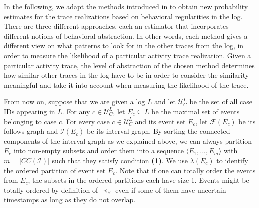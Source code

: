 In the following, we adapt the methods introduced in \cite{por} to obtain new probability estimates for the trace realizations based on behavioral regularities in the log.
There are three different approaches, each an estimator that incorporates different notions of behavioral abstraction.
In other words, each method gives a different view on what patterns to look for in the other traces from the log, in order to measure the likelihood of a particular activity trace realization.
Given a particular activity trace, the level of abstraction of the chosen method determines how similar other traces in the log have to be in order to consider the similarity meaningful and take it into account when measuring the likelihood of the trace.

From now on, suppose that we are given a log $L$ and let $\mathcal{U}_C^L$ be the set of all case IDs appearing in $L$.
For any $c \in \mathcal{U}_C^L$, let $E_c \subseteq L$ be the maximal set of events belonging to case $c$.
For every case $c \in \mathcal{U}_C^L$ and its event set $E_c$, let $\mathcal{F}(E_c)$ be its follows graph and $\mathcal{I}(E_c)$ be its interval graph.
By sorting the connected components of the interval graph as we explained above, we can always partition $E_c$ into non-empty subsets and order them into a sequence $\langle E_1,...,E_m\rangle$ with $m=|CC(\mathcal{I})|$ such that they satisfy condition \textbf{(1)}.
We use $\lambda(E_c)$ to identify the ordered partition of event set $E_c$.
Note that if one can totally order the events from $E_c$, the subsets in the ordered partitions each have size 1.
Events might be totally ordered by definition of $\prec_{\mathcal{E}}$ even if some of them have uncertain timestamps as long as they do not overlap.



